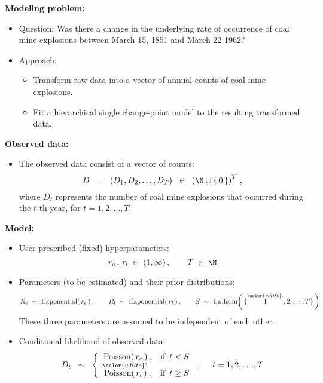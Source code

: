 \vskip 0.5cm
\noindent
\textbf{Modeling problem:}
\begin{itemize}
\item
	Question:
	\vskip 0.05cm
	Was there a change in the underlying rate of occurrence of coal mine explosions
	between March 15, 1851 and March 22 1962?

\item
	Approach:
	\vskip 0.05cm
	\begin{itemize}
	\item
		Transform raw data into a vector of annual counts of coal mine explosions.
	\item
		Fit a hierarchical single change-point model to the resulting transformed data.
	\end{itemize}

\end{itemize}


\vskip 0.5cm
\noindent
\textbf{Observed data:}
\begin{itemize}
\item
	The observed data consist of a vector of counts:
	\begin{equation*}
	D \;\; = \;\; (D_{1}, D_{2}, \ldots , D_{T}) \;\; \in \;\; \left(\N\cup\{\,0\,\}\right)^{T}\,,
	\end{equation*}
	where
	$D_{t}$ represents the number of coal mine explosions that occurred during the $t$-th year,
	for $t = 1, 2, \ldots, T$.
\end{itemize}


\vskip 0.5cm
\noindent
\textbf{Model:}
\begin{itemize}
\item
	User-prescribed (fixed) hyperparameters:
	\begin{equation*}
	r_{e}\,,\, r_{l} \; \in \; (1,\infty)\,,
	\quad\quad
	T \; \in \; \N
	\end{equation*}
\item
	Parameters (to be estimated) and their prior distributions:
	\begin{equation*}
	R_{e} \;\sim\; \textnormal{Exponential}(\,r_{e}\,)\,,
	\quad\quad
	R_{l} \;\sim\; \textnormal{Exponential}(\,r_{l}\,)\,,
	\quad\quad
	S \;\sim\; \textnormal{Uniform}\!\left(\,\{\overset{{\color{white}.}}{1},2,\ldots,T\}\,\right)
	\end{equation*}
	These three parameters are assumed to be independent of each other.
\item
	Conditional likelihood of observed data:
	\begin{equation*}
	D_{t}
	\;\; \sim \;\;
		\left\{\begin{array}{ccc}
		\textnormal{Poisson}(\,r_{e}\,)\,, & \textnormal{if \,$t < S$}
		\\
		\overset{{\color{white}1}}{\textnormal{Poisson}(\,r_{l}\,)}\,, & \textnormal{if \,$t \geq S$}
		\end{array}\right.,
	\quad\;\;
	t = 1, 2, \ldots, T
	\end{equation*}
\end{itemize}

